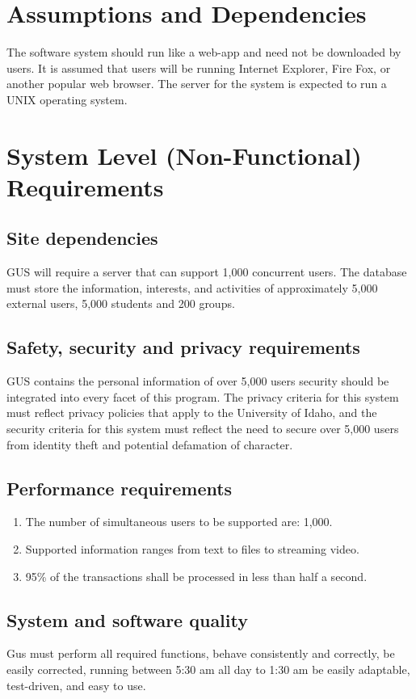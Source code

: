 	\section{Assumptions and Dependencies}
		The software system should run like a web-app and need not be
		downloaded by users.  It is assumed that users will be running
		Internet Explorer, Fire Fox, or another popular web browser.
		The server for the system is expected to run a UNIX operating
		system.
	\section{System Level (Non-Functional) Requirements}
		\subsection{Site dependencies}
			GUS will require a server that can support 1,000 concurrent
			users.  The database must store the information, interests,
			and activities of approximately 5,000 external users, 5,000
			students and 200 groups.
		\subsection{Safety, security and privacy requirements}
			GUS contains the personal information of over 5,000 users
			security should be integrated into every facet of this
			program.  The privacy criteria for this system must reflect
			privacy policies that apply to the University of Idaho, and
			the security criteria for this system must reflect the need
			to secure over 5,000 users from identity theft and potential
			defamation of character.
		\subsection{Performance requirements}
		\begin{enumerate}
			\item The number of simultaneous users to be supported are: 1,000.
			\item Supported information ranges from text to files to streaming video.
			\item 95\% of the transactions shall be processed in less than half a second.
		\end{enumerate}
		\subsection{System and software quality}
			Gus must perform all required functions, behave consistently
			and correctly, be easily corrected, running between 5:30 am
			all day to 1:30 am be easily adaptable, test-driven, and easy
			to use.
